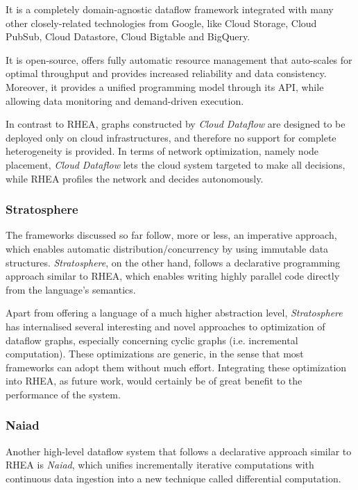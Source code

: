 \documentclass[sigplan,review,anonymous]{acmart}\settopmatter{printfolios=true,printacmref=false}
\begin{document}
It is a completely domain-agnostic dataflow framework integrated with many other closely-related technologies from Google, like Cloud Storage, Cloud PubSub, Cloud Datastore, Cloud Bigtable and BigQuery.

It is open-source, offers fully automatic resource management that auto-scales for optimal throughput and provides increased reliability and data consistency. Moreover, it provides a unified programming model through its API, while allowing data monitoring and demand-driven execution.

In contrast to \textsc{RHEA}, graphs constructed by \textit{Cloud Dataflow} are designed to be deployed only on cloud infrastructures, and therefore no support for complete heterogeneity is provided. In terms of network optimization, namely node placement,  \textit{Cloud Dataflow} lets the cloud system targeted to make all decisions, while \textsc{RHEA} profiles the network and decides autonomously.

\subsubsection{Stratosphere}

The frameworks discussed so far follow, more or less, an imperative approach, which enables automatic distribution/concurrency by using immutable data structures. \textit{Stratosphere}\cite{stratosphere}, on the other hand, follows a declarative programming approach similar to \textsc{RHEA}, which enables writing highly parallel code directly from the language's semantics.

Apart from offering a language of a much higher abstraction level, \textit{Stratosphere} has internalised several interesting and novel approaches to optimization of dataflow graphs, especially concerning cyclic graphs (i.e. incremental computation)\cite{spinning}. These optimizations are generic, in the sense that most frameworks can adopt them without much effort. Integrating these optimization into \textsc{RHEA}, as future work, would certainly be of great benefit to the performance of the system.

\subsubsection{Naiad}

Another high-level dataflow system that follows a declarative approach similar to \textsc{RHEA} is \textit{Naiad}, which unifies incrementally iterative computations with continuous data ingestion into a new
technique called differential computation.
\end{document}
